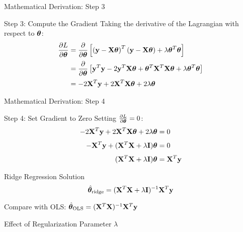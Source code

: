 \documentclass{beamer}
\begin{document}
\begin{frame}{Mathematical Derivation: Step 3}
\begin{codebox}{Step 3: Compute the Gradient}
Taking the derivative of the Lagrangian with respect to $\boldsymbol{\theta}$:
{\small
\begin{align}
\frac{\partial L}{\partial \boldsymbol{\theta}} &= \frac{\partial}{\partial \boldsymbol{\theta}}\left[\left(\mathbf{y}-\mathbf{X}\boldsymbol{\theta}\right)^T\left(\mathbf{y}-\mathbf{X}\boldsymbol{\theta}\right) + \lambda \boldsymbol{\theta}^T\boldsymbol{\theta}\right] \\[0.2em]
&= \frac{\partial}{\partial \boldsymbol{\theta}}\left[\mathbf{y}^T\mathbf{y} - 2\mathbf{y}^T\mathbf{X}\boldsymbol{\theta} + \boldsymbol{\theta}^T\mathbf{X}^T\mathbf{X}\boldsymbol{\theta} + \lambda \boldsymbol{\theta}^T\boldsymbol{\theta}\right] \\[0.2em]
&= -2\mathbf{X}^T\mathbf{y} + 2\mathbf{X}^T\mathbf{X}\boldsymbol{\theta} + 2\lambda\boldsymbol{\theta}
\end{align}
}
\end{codebox}
\end{frame}

\begin{frame}{Mathematical Derivation: Step 4}
\begin{codebox}{Step 4: Set Gradient to Zero}
Setting $\frac{\partial L}{\partial \boldsymbol{\theta}} = 0$:
\begin{align}
-2\mathbf{X}^T\mathbf{y} + 2\mathbf{X}^T\mathbf{X}\boldsymbol{\theta} + 2\lambda\boldsymbol{\theta} &= 0 \\[0.3em]
-\mathbf{X}^T\mathbf{y} + (\mathbf{X}^T\mathbf{X} + \lambda\mathbf{I})\boldsymbol{\theta} &= 0 \\[0.3em]
(\mathbf{X}^T\mathbf{X} + \lambda\mathbf{I})\boldsymbol{\theta} &= \mathbf{X}^T\mathbf{y}
\end{align}
\end{codebox}
\pause

\begin{theorembox}{Ridge Regression Solution}
$$\hat{\boldsymbol{\theta}}_{\text{ridge}} = (\mathbf{X}^T\mathbf{X} + \lambda\mathbf{I})^{-1}\mathbf{X}^T\mathbf{y}$$
\end{theorembox}

Compare with OLS: $\hat{\boldsymbol{\theta}}_{\text{OLS}} = (\mathbf{X}^T\mathbf{X})^{-1}\mathbf{X}^T\mathbf{y}$
\end{frame}

\begin{frame}{Effect of Regularization Parameter $\lambda$}
\vspace{0.4cm}
\end{frame}
\end{document}
